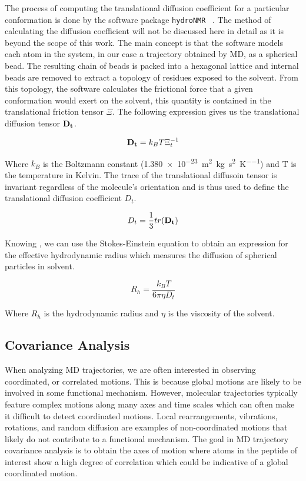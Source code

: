 The process of computing the translational diffusion coefficient for a particular conformation is done by the software package \texttt{hydroNMR} ~\cite{de2000hydronmr}. The method of calculating the diffusion coefficient will not be discussed here in detail as it is beyond the scope of this work. The main concept is that the software models each atom in the system, in our case a trajectory obtained by MD, as a spherical bead. The resulting chain of beads is packed into a hexagonal lattice and internal beads are removed to extract a topology of residues exposed to the solvent. From this topology, the software calculates the frictional force that a given conformation would exert on the solvent, this quantity is contained in the translational friction tensor $\Xi$. The following expression gives us the translational diffusion tensor $\mathbf{D_t}$.

\begin{equation}
\mathbf{D_{t}} = k_BT\Xi_{t}^{-1}
\end{equation}

Where $k_B$ is the Boltzmann constant (\SI{1.380e-23}{\square\metre\kilo\gram\per\square\second\per\kelvin}) and T is the temperature in Kelvin. The trace of the translational diffusoin tensor is invariant regardless of the molecule's orientation and is thus used to define the translational diffusion coefficient $D_t$.

\begin{equation}
D_t = \frac{1}{3}tr(\mathbf{D_t})
\end{equation}

Knowing \diffusion, we can use the Stokes-Einstein equation to obtain an expression for the effective hydrodynamic radius which measures the diffusion of spherical particles in solvent.

\begin{equation}
R_h = \frac{k_{B}T}{6\pi \eta D_{t}}
\label{eq:stokes}
\end{equation}

Where $R_h$ is the hydrodynamic radius and $\eta$ is the viscosity of the solvent.

\subsection{Covariance Analysis}

When analyzing MD trajectories, we are often interested in observing coordinated, or correlated motions. This is because global motions are likely to be involved in some functional mechanism. However, molecular trajectories typically feature complex motions along many axes and time scales which can often make it difficult to detect coordinated motions. Local rearrangements, vibrations, rotations, and random diffusion are examples of non-coordinated motions that likely do not contribute to a functional mechanism. The goal in MD trajectory covariance analysis is to obtain the axes of motion where atoms in the peptide of interest show a high degree of correlation which could be indicative of a global coordinated motion. 

